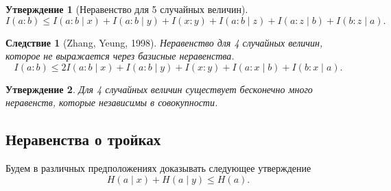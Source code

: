 \documentclass[12pt]{article}
\theoremstyle{definition}
\theoremstyle{plain}
\newtheorem{statement}{Утверждение}[section]
\newtheorem{corollary}{Следствие}[section]
\theoremstyle{remark}
\begin{document}
\begin{statement}[Неравенство для 5 случайных величин]
    \[
        I(a:b)\le I(a:b\mid x) + I(a:b\mid y) + I(x:y) 
        + I(a:b\mid z) + I(a:z\mid b) + I(b:z\mid a).
    \]
\end{statement}
\begin{corollary}[Zhang, Yeung, 1998]
    Неравенство для 4 случайных величин, которое не выражается через базисные неравенства.
    \[
        I(a:b)\le 2I(a:b\mid x) + I(a:b\mid y) + I(x:y) 
        + I(a:x\mid b) + I(b:x\mid a).
    \]
\end{corollary}
\begin{statement}
    Для 4 случайных величин существует бесконечно много неравенств, которые независимы в
    совокупности.
\end{statement}

\subsection{Неравенства о тройках}
Будем в различных предположениях доказывать следующее утверждение
\[
    H(a\mid x) + H(a\mid y) \le H(a).
\]
\end{document}
